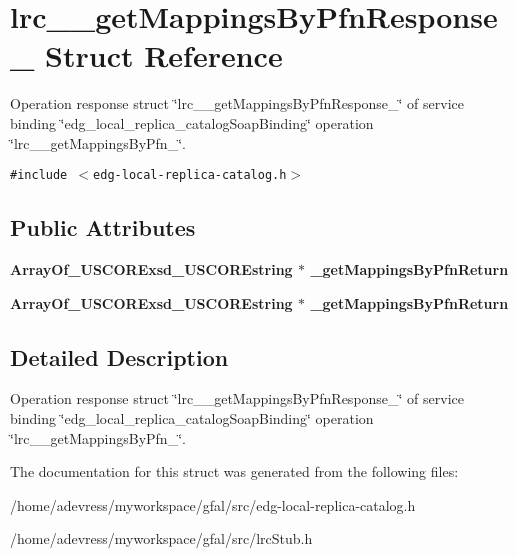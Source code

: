 \section{lrc\_\-\_\-get\-Mappings\-By\-Pfn\-Response\_\- Struct Reference}
\label{structlrc____getMappingsByPfnResponse__}
Operation response struct \char`\"{}lrc\_\-\_\-get\-Mappings\-By\-Pfn\-Response\_\-\char`\"{} of service binding \char`\"{}edg\_\-local\_\-replica\_\-catalog\-Soap\-Binding\char`\"{} operation \char`\"{}lrc\_\-\_\-get\-Mappings\-By\-Pfn\_\-\char`\"{}.  


{\tt \#include $<$edg-local-replica-catalog.h$>$}

\subsection*{Public Attributes}
\begin{CompactItemize}
\item 
\bf{Array\-Of\_\-USCORExsd\_\-USCOREstring} $\ast$ \textbf{\_\-get\-Mappings\-By\-Pfn\-Return}\label{structlrc____getMappingsByPfnResponse___3a9a4692117ba0decc3bd7b1415ddfef}

\item 
\bf{Array\-Of\_\-USCORExsd\_\-USCOREstring} $\ast$ \textbf{\_\-get\-Mappings\-By\-Pfn\-Return}\label{structlrc____getMappingsByPfnResponse___3a9a4692117ba0decc3bd7b1415ddfef}

\end{CompactItemize}


\subsection{Detailed Description}
Operation response struct \char`\"{}lrc\_\-\_\-get\-Mappings\-By\-Pfn\-Response\_\-\char`\"{} of service binding \char`\"{}edg\_\-local\_\-replica\_\-catalog\-Soap\-Binding\char`\"{} operation \char`\"{}lrc\_\-\_\-get\-Mappings\-By\-Pfn\_\-\char`\"{}. 



The documentation for this struct was generated from the following files:\begin{CompactItemize}
\item 
/home/adevress/myworkspace/gfal/src/edg-local-replica-catalog.h\item 
/home/adevress/myworkspace/gfal/src/lrc\-Stub.h\end{CompactItemize}
